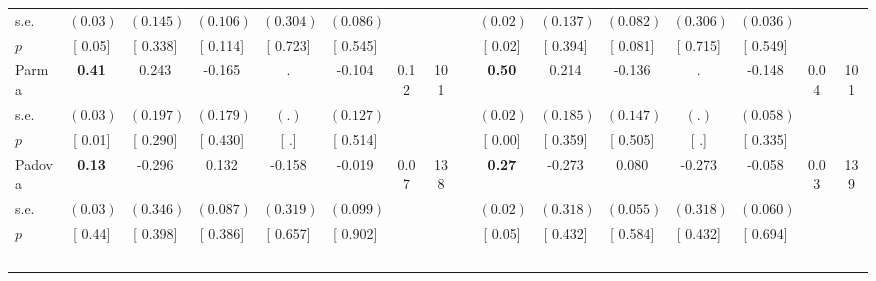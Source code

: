 \begin{longtable}{L{8em} c c c c c c c p{1em} c c c c c c c}
\quad \quad \quad \quad s.e.& $ (     0.03)$ & $ (    0.145)$ & $ (    0.106)$ & $ (    0.304)$ & $ (    0.086)$ & & & & $ (     0.02)$ & $ (    0.137)$ & $ (    0.082)$ & $ (    0.306)$ & $ (    0.036)$ & &  \\*
\quad \quad \quad \quad $ p$ & [     0.05] & [    0.338] & [    0.114] & [    0.723] & [    0.545] & & & & [     0.02] & [    0.394] & [    0.081] & [    0.715] & [    0.549] & &  \\[1em]
\quad \quad \quad Parma& \textbf{     0.41} &     0.243 &    -0.165 &         . &    -0.104 &      0.12 &       101 & & \textbf{     0.50} &     0.214 &    -0.136 &         . &    -0.148 &      0.04 &       101  \\*
\quad \quad \quad \quad s.e.& $ (     0.03)$ & $ (    0.197)$ & $ (    0.179)$ & $ (        .)$ & $ (    0.127)$ & & & & $ (     0.02)$ & $ (    0.185)$ & $ (    0.147)$ & $ (        .)$ & $ (    0.058)$ & &  \\*
\quad \quad \quad \quad $ p$ & [     0.01] & [    0.290] & [    0.430] & [        .] & [    0.514] & & & & [     0.00] & [    0.359] & [    0.505] & [        .] & [    0.335] & &  \\[1em]
\quad \quad \quad Padova& \textbf{     0.13} &    -0.296 &     0.132 &    -0.158 &    -0.019 &      0.07 &       138 & & \textbf{     0.27} &    -0.273 &     0.080 &    -0.273 &    -0.058 &      0.03 &       139  \\*
\quad \quad \quad \quad s.e.& $ (     0.03)$ & $ (    0.346)$ & $ (    0.087)$ & $ (    0.319)$ & $ (    0.099)$ & & & & $ (     0.02)$ & $ (    0.318)$ & $ (    0.055)$ & $ (    0.318)$ & $ (    0.060)$ & &  \\*
\quad \quad \quad \quad $ p$ & [     0.44] & [    0.398] & [    0.386] & [    0.657] & [    0.902] & & & & [     0.05] & [    0.432] & [    0.584] & [    0.432] & [    0.694] & &  \\[1em]
~\\[1em]
\end{longtable}